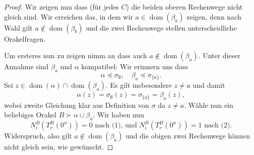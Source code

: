 \documentclass[nofonts]{uebung}
\DeclareMathOperator{\dom}{dom}
\begin{document}
\begin{proof}
    Wir zeigen nun dass (für jedes $C$) die beiden oberen Rechenwege nicht gleich sind. 
    Wir erreichen das, in dem wir $a\in\dom(\beta_a)$ zeigen, denn nach Wahl gilt $a\not\in\dom(\beta_b)$ und die zwei Rechenwege stellen unterscheidliche Orakelfragen.

    Um ersteres nun zu zeigen nimm an dass auch $a\not\in\dom(\beta_a)$.
    Unter dieser Annahme sind $\beta_a$ und $\alpha$ kompatibel:
    Wir erinnern uns dass 
    \[ \alpha\preceq\sigma_\emptyset, \quad \beta_a\preceq\sigma_{\{a\}}. \]
    Sei $z\in\dom(\alpha)\cap\dom(\beta_a)$. Es gilt insbesondere $z\neq a$ und damit
    \[ \alpha(z)=\sigma_\emptyset(z)=\sigma_{\{a\}}=\beta_a(z), \]
    wobei zweite Gleichung klar aus Definition von $\sigma$ da $z\neq a$.
    Wähle nun ein beliebiges Orakel $B\succ\alpha\cup\beta_a$.
    Wir haben nun 
    \[ N_i^B(T_r^B(0^n))=0 \text{ nach (1), und } N_i^B(T_r^B(0^n))=1 \text{ nach (2).} \]
    Widerspruch, also gilt $a\not\in\dom(\beta_a)$ und die obigen zwei Rechenwege können nicht gleich sein, wie gewünscht.
\end{proof}
\end{document}
